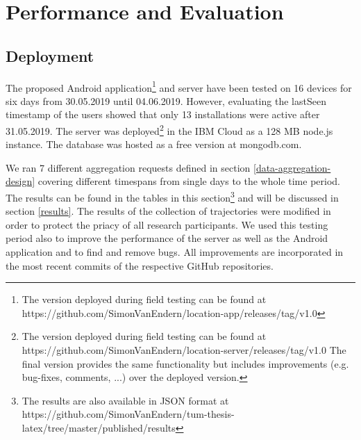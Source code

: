 \chapter{Performance and Evaluation}\label{chapter:performance}
\section{Deployment}
The proposed Android application\footnote{The version deployed during field testing can be found at https://github.com/SimonVanEndern/location-app/releases/tag/v1.0} and server have been tested on 16 devices for six days from 30.05.2019 until 04.06.2019. However, evaluating the lastSeen timestamp of the users showed that only 13 installations were active after 31.05.2019. The server was deployed\footnote{The version deployed during field testing can be found at https://github.com/SimonVanEndern/location-server/releases/tag/v1.0 The final version provides the same functionality but includes improvements (e.g. bug-fixes, comments, ...) over the deployed version.} in the IBM Cloud as a 128 MB node.js instance. The database was hosted as a free version at mongodb.com.

We ran 7 different aggregation requests defined in section \ref{data-aggregation-design} covering different timespans from single days to the whole time period. The results can be found in the tables in this section\footnote{The results are also available in JSON format at https://github.com/SimonVanEndern/tum-thesis-latex/tree/master/published/results} and will be discussed in section \ref{results}. The results of the collection of trajectories were modified in order to protect the priacy of all research participants. We used this testing period also to improve the performance of the server as well as the Android application and to find and remove bugs. All improvements are incorporated in the most recent commits of the respective GitHub repositories.

